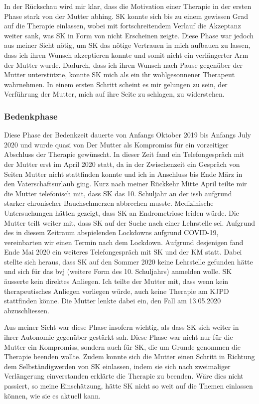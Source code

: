 In der Rückschau wird mir klar, dass die Motivation einer Therapie in der ersten Phase stark von der Mutter abhing. SK konnte sich bis zu einem gewissen Grad auf die Therapie einlassen, wobei mit fortschreitendem Verlauf die Akzeptanz weiter sank, was SK in Form von nicht Erscheinen zeigte. Diese Phase war jedoch aus meiner Sicht nötig, um SK das nötige Vertrauen in mich aufbauen zu lassen, dass ich ihren Wunsch akzeptieren konnte und somit nicht ein verlängerter Arm der Mutter wurde. Dadurch, dass ich ihren Wunsch nach Pause gegenüber der Mutter unterstützte, konnte SK mich als ein ihr wohlgesonnener Therapeut wahrnehmen. In einem ersten Schritt scheint es mir gelungen zu sein, der Verführung der Mutter, mich auf ihre Seite zu schlagen, zu widerstehen.  

\subsubsection{Bedenkphase}
Diese Phase der Bedenkzeit dauerte von Anfangs Oktober 2019 bis Anfangs July 2020 und wurde quasi von Der Mutter als Kompromiss für ein vorzeitiger Abschluss der Therapie gewünscht. In dieser Zeit fand ein Telefongespräch mit der Mutter erst im April 2020 statt, da in der Zwischenzeit ein Gespräch von Seiten Mutter nicht stattfinden konnte und ich in Anschluss bis Ende März in den Vaterschaftsurlaub ging. Kurz nach meiner Rückkehr Mitte April teilte mir die Mutter telefonisch mit, dass SK das 10. Schuljahr an der \ac{issh} aufgrund starker chronischer Bauchschmerzen abbrechen musste. Medizinische Untersuchungen hätten gezeigt, dass SK an Endrometriose leiden würde. Die Mutter teilt weiter mit, dass SK auf der Suche nach einer Lehrstelle sei. Aufgrund des in diesem Zeitraum abspielenden Lockdowns aufgrund COVID-19, vereinbarten wir einen Termin nach dem Lockdown. Aufgrund desjenigen fand Ende Mai 2020 ein weiteres Telefongespräch mit SK und der KM statt. Dabei stellte sich heraus, dass SK auf den Sommer 2020 keine Lehrstelle gefunden hätte und sich für das \ac{bvj} (weitere Form des 10. Schuljahrs) anmelden wolle. SK äusserte kein direktes Anliegen. Ich teilte der Mutter mit, dass wenn kein therapeutisches Anliegen vorliegen würde, auch keine Therapie am KJPD stattfinden könne. Die Mutter lenkte dabei ein, den Fall am 13.05.2020 abzuschliessen.

Aus meiner Sicht war diese Phase insofern wichtig, als dass SK sich weiter in ihrer Autonomie gegenüber gestärkt sah. Diese Phase war nicht nur für die Mutter ein Kompromiss, sondern auch für SK, die um Grunde genommen die Therapie beenden wollte. Zudem konnte sich die Mutter einen Schritt in Richtung dem Selbständigwerden von SK einlassen, indem sie sich nach zweimaliger Verlängerung einverstanden erklärte die Therapie zu beenden. Wäre dies nicht passiert, so meine Einschätzung, hätte SK nicht so weit auf die Themen einlassen können, wie sie es aktuell kann. 

